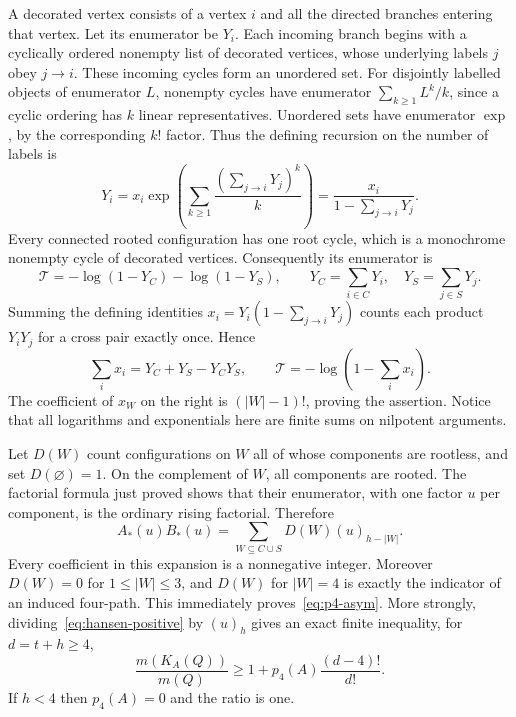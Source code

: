 \documentclass[11pt,a4paper]{article}
\numberwithin{equation}{section}
\begin{document}
A decorated vertex consists of a vertex $i$ and all the directed branches entering that vertex. Let its enumerator be $Y_i$. Each incoming branch begins with a cyclically ordered nonempty list of decorated vertices, whose underlying labels $j$ obey $j\to i$. These incoming cycles form an unordered set. For disjointly labelled objects of enumerator $L$, nonempty cycles have enumerator $\sum_{k\ge1}L^k/k$, since a cyclic ordering has $k$ linear representatives. Unordered sets have enumerator $\exp$, by the corresponding $k!$ factor. Thus the defining recursion on the number of labels is
\[
 Y_i=x_i\exp\!\left(\sum_{k\ge1}\frac{(\sum_{j\to i}Y_j)^k}{k}\right)
     =\frac{x_i}{1-\sum_{j\to i}Y_j}.
\]
Every connected rooted configuration has one root cycle, which is a monochrome nonempty cycle of decorated vertices. Consequently its enumerator is
\[
 \mathcal T=-\log(1-Y_C)-\log(1-Y_S),
 \qquad Y_C=\sum_{i\in C}Y_i,\quad Y_S=\sum_{j\in S}Y_j .
\]
Summing the defining identities $x_i=Y_i(1-\sum_{j\to i}Y_j)$ counts each product $Y_iY_j$ for a cross pair exactly once. Hence
\[
 \sum_i x_i=Y_C+Y_S-Y_CY_S,
 \qquad \mathcal T=-\log(1-\textstyle\sum_i x_i).
\]
The coefficient of $x_W$ on the right is $(|W|-1)!$, proving the assertion. Notice that all logarithms and exponentials here are finite sums on nilpotent arguments.

Let $D(W)$ count configurations on $W$ all of whose components are rootless, and set $D(\varnothing)=1$. On the complement of $W$, all components are rooted. The factorial formula just proved shows that their enumerator, with one factor $u$ per component, is the ordinary rising factorial. Therefore
\begin{equation}
 A_*(u)B_*(u)=\sum_{W\subseteq C\cup S}D(W)(u)_{h-|W|}.
 \label{eq:hansen-positive}
\end{equation}
Every coefficient in this expansion is a nonnegative integer. Moreover $D(W)=0$ for $1\le|W|\le3$, and $D(W)$ for $|W|=4$ is exactly the indicator of an induced four-path. This immediately proves~\eqref{eq:p4-asym}. More strongly, dividing~\eqref{eq:hansen-positive} by $(u)_h$ gives an exact finite inequality, for $d=t+h\ge4$,
\begin{equation}
 \frac{m(K_A(Q))}{m(Q)}\ge 1+p_4(A)\frac{(d-4)!}{d!}.
 \label{eq:hansen-global-gap}
\end{equation}
If $h<4$ then $p_4(A)=0$ and the ratio is one.
\end{document}
